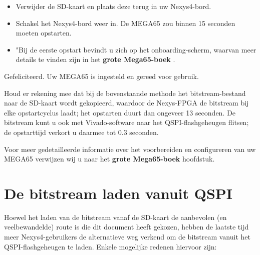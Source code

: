 \begin{itemize}
\begin{itemize}
      \begin{itemize}
        \item Let op: wanneer een bestand met de naam MEGA65.D81 aan de SD-kaart wordt toegevoegd, wordt dit automatisch gemonteerd bij het opstarten.        \item Zorg ervoor dat alle .D81-bestanden namen hebben die voldoen aan de oude DOS 8.3-tekenlimiet en in hoofdletters zijn geschreven. Deze beperking wordt in een toekomstige versie verwijderd.
      \end{itemize}
  \end{itemize}
\item{Verwijder de SD-kaart} en plaats deze terug in uw Nexys4-bord.\item{Schakel het Nexys4-bord} weer in. De MEGA65 zou binnen 15 seconden moeten opstarten.\item"Bij de eerste opstart bevindt u zich op het onboarding-scherm, waarvan meer details te vinden zijn in
\ifdefined\printmanual
het {\bf grote Mega65-boek}
\else
{}
\fi
.

\end{itemize}

Gefeliciteerd. Uw MEGA65 is ingesteld en gereed voor gebruik.

Houd er rekening mee dat bij de bovenstaande methode het bitstream-bestand naar de SD-kaart wordt gekopieerd, waardoor de Nexys-FPGA de bitstream bij elke opstartcyclus laadt; het opstarten duurt dan ongeveer 13 seconden. De bitstream kunt u ook met Vivado-software naar het QSPI-flashgeheugen flitsen; de opstarttijd verkort u daarmee tot 0.3 seconden.

Voor meer gedetailleerde informatie over het voorbereiden en configureren van uw MEGA65 verwijzen wij u naar
\ifdefined\printmanual
het {\bf grote Mega65-boek}
\else
{}
\fi
hoofdstuk.

\section{De bitstream laden vanuit QSPI}

Hoewel het laden van de bitstream vanaf de SD-kaart de aanbevolen (en veelbewandelde) route is die dit document heeft gekozen, hebben de laatste tijd meer Nexys4-gebruikers de alternatieve weg verkend om de bitstream vanuit het QSPI-flashgeheugen te laden. Enkele mogelijke redenen hiervoor zijn:

